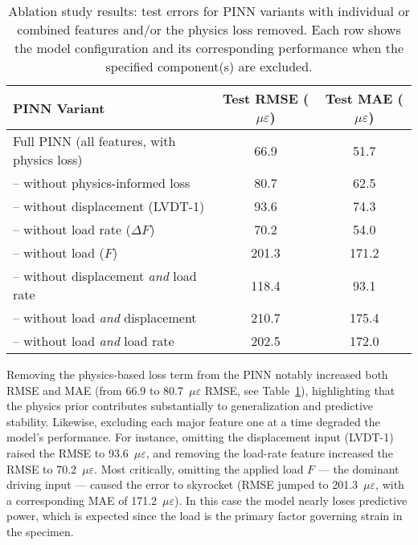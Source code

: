 \documentclass{article}
\begin{document}
\begin{table}[H]
    \centering
    \begin{tabular}{lcc}
        \toprule
        PINN Variant & Test RMSE ($\mu\varepsilon$) & Test MAE ($\mu\varepsilon$) \\
        \midrule
        Full PINN (all features, with physics loss)   & 66.9  & 51.7 \\
        \hspace{1em}– without physics-informed loss            & 80.7  & 62.5 \\
        \hspace{1em}– without displacement (LVDT-1)            & 93.6  & 74.3 \\
        \hspace{1em}– without load rate ($\Delta F$)           & 70.2  & 54.0 \\
        \hspace{1em}– without load ($F$)                       & 201.3 & 171.2 \\
        \midrule
        \hspace{1em}– without displacement \textit{and} load rate       & 118.4 & 93.1 \\
        \hspace{1em}– without load \textit{and} displacement            & 210.7 & 175.4 \\
        \hspace{1em}– without load \textit{and} load rate               & 202.5 & 172.0 \\
        \bottomrule
    \end{tabular}
    \caption{Ablation study results: test errors for PINN variants with individual or combined features and/or the physics loss removed. Each row shows the model configuration and its corresponding performance when the specified component(s) are excluded.}
    \label{tab:ablation}
\end{table}

Removing the physics-based loss term from the PINN notably increased both RMSE and MAE (from 66.9 to 80.7~$\mu\varepsilon$ RMSE, see Table~\ref{tab:ablation}), highlighting that the physics prior contributes substantially to generalization and predictive stability. Likewise, excluding each major feature one at a time degraded the model’s performance. For instance, omitting the displacement input (LVDT-1) raised the RMSE to 93.6~$\mu\varepsilon$, and removing the load-rate feature increased the RMSE to 70.2~$\mu\varepsilon$. Most critically, omitting the applied load $F$ — the dominant driving input — caused the error to skyrocket (RMSE jumped to 201.3~$\mu\varepsilon$, with a corresponding MAE of 171.2~$\mu\varepsilon$). In this case the model nearly loses predictive power, which is expected since the load is the primary factor governing strain in the specimen.
\end{document}
